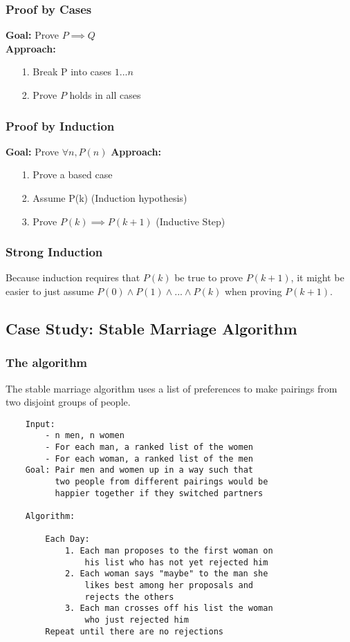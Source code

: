 \documentclass{article}
\begin{document}
\subsubsection{Proof by Cases}
\textbf{Goal: } Prove $P \implies Q$\\
\textbf{Approach: }
\begin{itemize}
    \item[1. ]Break P into cases $1...n$
    \item[2. ]Prove $P$ holds in all cases 
\end{itemize}
\subsubsection{Proof by Induction}
\textbf{Goal:} Prove $\forall n, P(n)$
\textbf{Approach: }
\begin{itemize}
    \item[1. ]Prove a based case
    \item[2. ]Assume P(k) (Induction hypothesis)
    \item[3. ]Prove $P(k) \implies P(k+1)$ (Inductive Step)
\end{itemize}
\subsubsection{Strong Induction}
Because induction requires that $P(k)$ be true to prove $P(k+1)$,
it might be easier to just assume $P(0)\land P(1) \land ... \land P(k)$ when proving $P(k+1)$.
\subsection{Case Study: Stable Marriage Algorithm}
\subsubsection{The algorithm}
The stable marriage algorithm uses a list of preferences to make pairings from two disjoint groups of people.
\begin{lstlisting}
    Input: 
        - n men, n women
        - For each man, a ranked list of the women
        - For each woman, a ranked list of the men
    Goal: Pair men and women up in a way such that 
          two people from different pairings would be 
          happier together if they switched partners

    Algorithm:

        Each Day:
            1. Each man proposes to the first woman on 
                his list who has not yet rejected him
            2. Each woman says "maybe" to the man she 
                likes best among her proposals and 
                rejects the others
            3. Each man crosses off his list the woman 
                who just rejected him
        Repeat until there are no rejections
\end{lstlisting}
\end{document}
